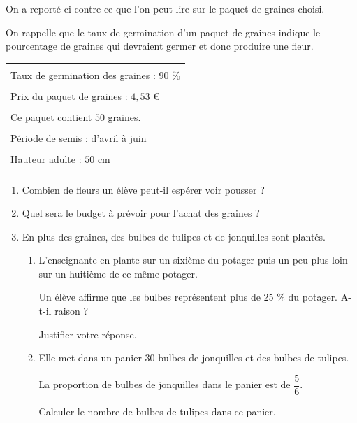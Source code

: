 \medskip
\begin{minipage}{7cm}
    On a reporté ci-contre ce que l’on peut lire sur le paquet de graines choisi.

    \medskip
    On rappelle que le taux de germination d'un paquet de graines indique le pourcentage de graines qui devraient
    germer et donc produire une fleur.
\end{minipage}
\hspace{1cm}
\begin{minipage}{9cm}
    \noindent\begin{tabularx}{0.9\linewidth}{|X|}
        \hline
        \\        
        Taux de germination des graines : $90$ \%\\ 
        \\       
        Prix du paquet de graines : $4,53$ \euro \\
        \\
        Ce paquet contient $50$ graines.\\
        \\
        Période de semis : d'avril à juin\\
        \\
        Hauteur adulte : $50$ cm\\
        \\
        \hline         
    \end{tabularx}
\end{minipage}

\begin{enumerate}
    \item Combien de fleurs un élève peut-il espérer voir pousser ?
    \item Quel sera le budget à prévoir pour l'achat des graines ?
    \item En plus des graines, des bulbes de tulipes et de jonquilles sont plantés.
    \begin{enumerate}
        \item L'enseignante en plante sur un sixième du potager puis un peu plus loin sur un huitième de ce même potager.
        
        Un élève affirme que les bulbes représentent plus de 25 \% du potager. A-t-il raison ?
        
        Justifier votre réponse.
        \item Elle met dans un panier $30$ bulbes de jonquilles et des bulbes de tulipes.
        
        La proportion de bulbes de jonquilles dans le panier est de $\dfrac{5}{6}$.

        Calculer le nombre de bulbes de tulipes dans ce panier.
    \end{enumerate}
\end{enumerate}
